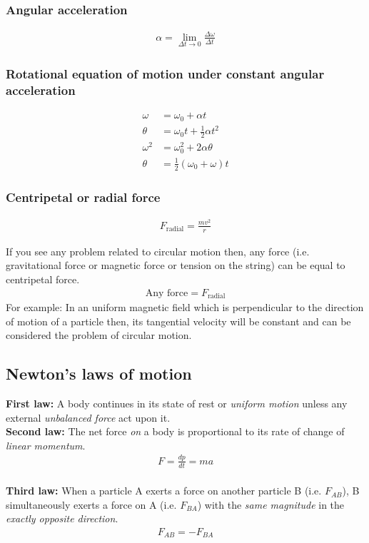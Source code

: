 \subsubsection*{Angular acceleration}
\begin{align*}
\alpha = \lim_{\Delta t \to 0}\frac{\Delta \omega}{\Delta t}
\end{align*}

\subsubsection*{Rotational equation of motion under constant angular acceleration}
\begin{align}
\omega &= \omega_{0} + \alpha t \\
\theta &= \omega_{0}t + \frac{1}{2}\alpha t^{2} \\
\omega^{2} &= \omega_{0}^{2} + 2\alpha \theta \\
\theta &= \frac{1}{2}(\omega_{0} + \omega)t
\end{align}

\subsubsection*{Centripetal or radial force}
\begin{align}
F_{\text{radial}} = \frac{mv^{2}}{r}
\end{align}

If you see any problem related to circular motion then, any force (i.e. gravitational force or magnetic force or tension on the string) can be equal to centripetal force. 
\begin{align*}
\text{Any force} = F_{\text{radial}}
\end{align*}
For example: In an uniform magnetic field which is perpendicular to the direction of motion of a particle then, its tangential velocity will be constant and can be considered the problem of circular motion.


\subsection{Newton's laws of motion}

\noindent\textbf{First law:} A body continues in its state of rest or \emph{uniform motion} unless any external \emph{unbalanced force} act upon it.
\\
\textbf{Second law:} The net force \emph{on} a body is proportional to its rate of change of \emph{linear momentum}.
\begin{align*}
F = \frac{dp}{dt} = ma
\end{align*}
\\
\textbf{Third law:} When a particle A exerts a force on another particle B (i.e. $F_{AB}$), B simultaneously exerts a force on A (i.e. $F_{BA}$) with the \emph{same magnitude} in the \emph{exactly opposite direction}.
\begin{align*}
F_{AB} = - F_{BA}
\end{align*}

